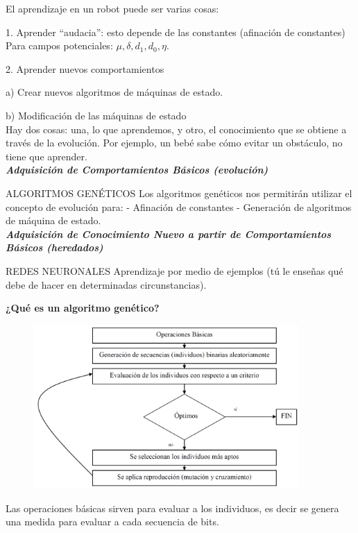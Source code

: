 El aprendizaje en un robot puede ser varias cosas:

1. Aprender “audacia”: esto depende de las constantes (afinación de constantes)
Para campos potenciales: $\mu, \delta, d_1, d_0, \eta $.

2. Aprender nuevos comportamientos

a) Crear nuevos algoritmos de máquinas de estado.

b) Modificación de las máquinas de estado \\

Hay dos cosas: una, lo que aprendemos, y otro, el conocimiento que se obtiene a través de la evolución. Por
ejemplo, un bebé sabe cómo evitar un obstáculo, no tiene que aprender. \\



\textbf{\textit{Adquisición de Comportamientos Básicos (evolución)}}

ALGORITMOS GENÉTICOS
Los algoritmos genéticos nos permitirán utilizar el concepto de evolución para:
- Afinación de constantes
- Generación de algoritmos de máquina de estado. \\


\textbf{\textit{Adquisición de Conocimiento Nuevo a partir de Comportamientos Básicos (heredados)}}

REDES NEURONALES
Aprendizaje por medio de ejemplos (tú le enseñas qué debe de hacer en determinadas circunstancias).


\textbf{¿Qué es un algoritmo genético?}

\begin{figure}[h!]
	\centering
	\includegraphics[width=0.9\textwidth]{images/img82.png}
	\label{figura82}
\end{figure}

Las operaciones básicas sirven para evaluar a los individuos, es decir se genera una medida para evaluar a
cada secuencia de bits.

